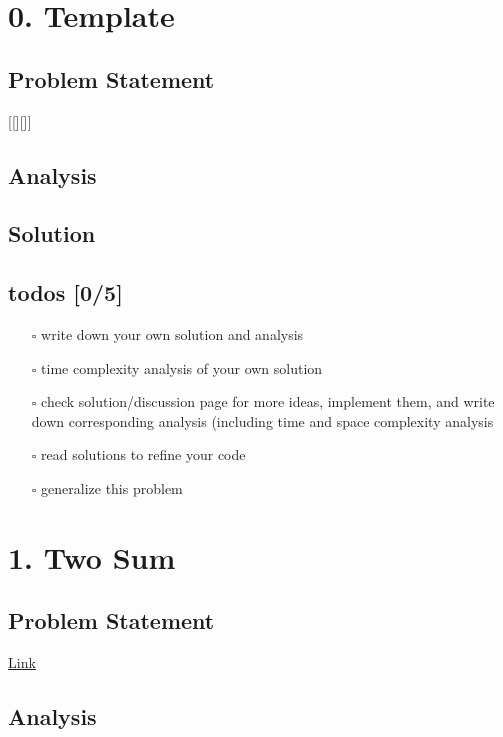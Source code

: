 \documentclass[12pt]{article}
\date{\today}
\title{}
\begin{document}
\tableofcontents


\section{0. Template \label{org62169e6}}
\label{sec:org3ad34b1}
\subsection{Problem Statement}
\label{sec:orgf7c973e}
[[][]]
\subsection{Analysis}
\label{sec:org781c1cf}

\subsection{Solution}
\label{sec:org98c8433}

\subsection{todos [0/5]}
\label{sec:orgc4b7044}
\begin{itemize}
\item[{$\square$}] write down your own solution and analysis
\item[{$\square$}] time complexity analysis of your own solution
\item[{$\square$}] check solution/discussion page for more ideas, implement them, and write down corresponding analysis (including time and space complexity analysis
\item[{$\square$}] read solutions to refine your code
\item[{$\square$}] generalize this problem
\end{itemize}
\section{1. Two Sum \label{org0d0e7a1}}
\label{sec:org5085370}
\subsection{Problem Statement}
\label{sec:orgb7679a4}
\href{https://leetcode.com/problems/two-sum/}{Link}
\subsection{Analysis}
\label{sec:org47f3c2e}
\end{document}
